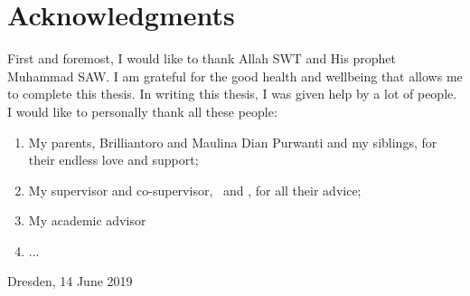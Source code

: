 \chapter*{Acknowledgments}

First and foremost, I would like to thank Allah SWT and His prophet Muhammad SAW.
I am grateful for the good health and wellbeing that allows me to complete this thesis.
In writing this thesis, I was given help by a lot of people.
I would like to personally thank all these people:

\begin{enumerate}
    \item My parents, Brilliantoro and Maulina Dian Purwanti and my siblings, for their endless love and support;
    \item My supervisor and co-supervisor, \pembimbing~and \pembimbingDua, for all their advice;
    \item My academic advisor
    \item ...
\end{enumerate}

\vspace*{0.1cm}
\begin{flushright}
Dresden, 14 June 2019\\[0.1cm]
\vspace*{1cm}
\penulis

\end{flushright}